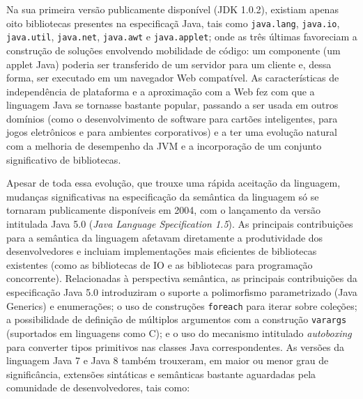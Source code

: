 
Na sua primeira vers\~{a}o publicamente dispon\'{i}vel 
(\acs{JDK} 1.0.2), existiam apenas oito bibliotecas 
presentes na especifica\c c\~{a} Java, tais como 
\texttt{java.lang}, \texttt{java.io}, \texttt{java.util},  
\texttt{java.net}, \texttt{java.awt} e \texttt{java.applet}; 
onde as tr\^{e}s \'{u}ltimas favoreciam a constru\c c\~{a}o de 
solu\c c\~{o}es envolvendo mobilidade de c\'{o}digo:
um componente (um applet Java) poderia ser transferido de um 
servidor para um cliente e, dessa forma, 
ser executado em um navegador Web compat\'{i}vel. As caracter\'{i}sticas de 
independ\^{e}ncia de plataforma e a aproxima\c c\~{a}o com a Web fez 
com que a linguagem Java se tornasse bastante popular, passando a ser 
usada em outros dom\'{i}nios (como o desenvolvimento de software 
para cart\~{o}es inteligentes, para jogos eletr\^{o}nicos e para ambientes corporativos) e a ter 
uma evolu\c c\~{a}o natural com a melhoria de desempenho da 
JVM e a incorpora\c c\~{a}o de um conjunto significativo de 
bibliotecas. 

Apesar de toda essa evolu\c c\~{a}o, que 
trouxe uma r\'{a}pida aceita\c c\~{a}o da linguagem, 
mudan\c cas significativas na especifica\c c\~{a}o 
da sem\^{a}ntica da linguagem s\'{o} se 
tornaram publicamente dispon\'{i}veis em 2004, 
com o lan\c camento da vers\~{a}o intitulada 
Java 5.0 (\emph{Java Language Specification 1.5}). As principais 
contribui\c c\~{o}es para a sem\^{a}ntica da linguagem afetavam 
diretamente a produtividade dos desenvolvedores e incluiam 
implementa\c c\~{o}es mais eficientes de bibliotecas 
existentes (como as bibliotecas de IO e as bibliotecas 
para programa\c c\~{a}o concorrente). Relacionadas \`{a} 
perspectiva sem\^{a}ntica, as principais contribui\c c\~{o}es 
da especifica\c c\~{a}o Java 5.0 introduziram o suporte 
a polimorfismo parametrizado (Java Generics) e enumera\c c\~{o}es; 
o uso de constru\c c\~{o}es \texttt{foreach} para iterar 
sobre cole\c c\~{o}es; a possibilidade de defini\c c\~{a}o de m\'{u}ltiplos 
argumentos com a constru\c c\~{a}o \texttt{varargs} (suportados em 
linguagens como C); e o uso do mecanismo intitulado 
\emph{autoboxing} para converter tipos primitivos nas 
classes Java correspondentes. 
As vers\~{o}es da linguagem Java 7 e Java 8 tamb\'{e}m trouxeram, 
em maior ou menor grau de signific\^{a}ncia, extens\~{o}es sint\'{a}ticas 
e sem\^{a}nticas bastante aguardadas pela comunidade de 
desenvolvedores, tais como:

